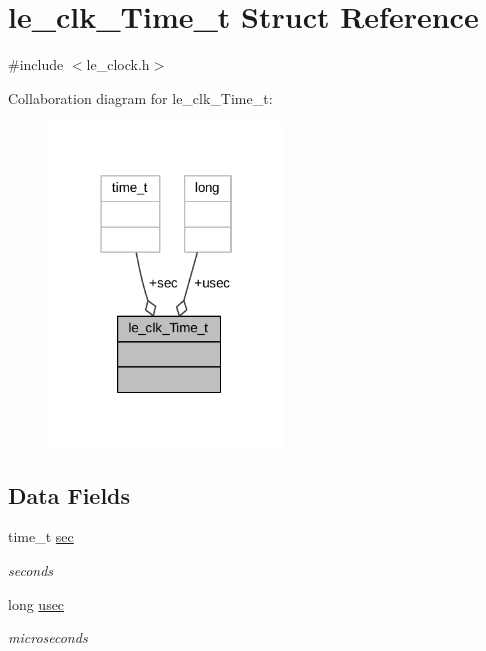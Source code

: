 \hypertarget{structle__clk___time__t}{}\section{le\+\_\+clk\+\_\+\+Time\+\_\+t Struct Reference}
\label{structle__clk___time__t}


{\ttfamily \#include $<$le\+\_\+clock.\+h$>$}



Collaboration diagram for le\+\_\+clk\+\_\+\+Time\+\_\+t\+:
\nopagebreak
\begin{figure}[H]
\begin{center}
\leavevmode
\includegraphics[width=178pt]{structle__clk___time__t__coll__graph}
\end{center}
\end{figure}
\subsection*{Data Fields}
\begin{DoxyCompactItemize}
\item 
time\+\_\+t \hyperlink{structle__clk___time__t_ae28e527dbd551b3537edc1737611782f}{sec}
\begin{DoxyCompactList}\small\item\em seconds \end{DoxyCompactList}\item 
long \hyperlink{structle__clk___time__t_a8324bdde9199a09a47489a3f246f184c}{usec}
\begin{DoxyCompactList}\small\item\em microseconds \end{DoxyCompactList}\end{DoxyCompactItemize}


